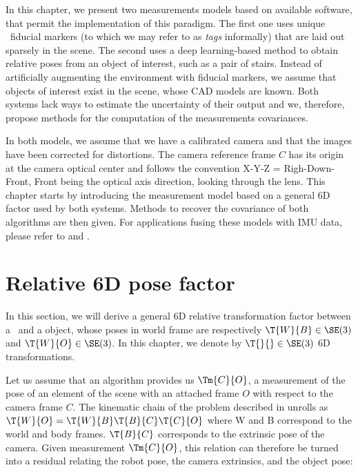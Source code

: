 In this chapter, we present two measurements models based on available software, that permit the implementation of this paradigm. The first one 
uses unique \apriltag\ fiducial markers \cite{wang2016iros} (to which we may refer to as \textit{tags} informally) that are laid out sparsely in the scene. 
The second uses a deep learning-based method \cite{labbe2020cosypose}
to obtain relative poses from an object of interest, such as a pair of stairs. Instead of artificially augmenting the environment with fiducial markers, we assume 
that objects of interest exist in the scene, whose CAD models are known. 
Both systems lack ways to estimate the uncertainty of their output and we, therefore, propose methods for the computation of the measurements covariances.

In both models, we assume that we have a calibrated camera and that the images have been corrected for distortions. The camera reference frame $C$ has its origin at 
the camera optical center and follows the convention X-Y-Z = Righ-Down-Front, Front being the optical axis direction, looking through the lens. This chapter starts by 
introducing the measurement model based on a general 6D factor used by both systems. Methods to recover the covariance of both algorithms are then given. 
For applications fusing these models with IMU data, please refer to  and .



\section{Relative 6D pose factor}
In this section, we will derive a general 6D relative transformation factor between a \keyframe\ and a object, whose poses in world frame are respectively $\T{W}{B} \in \SE(3)$ and $\T{W}{O} \in \SE(3)$. In this chapter, we denote by $\T{}{} \in \SE(3)$ 6D transformations.

Let us assume that an algorithm provides us $\Tm{C}{O}$, a measurement of the pose of an element 
of the scene with an attached frame $O$ with respect to the camera frame $C$.
The kinematic chain of the problem described in  unrolls as 
$\T{W}{O} = \T{W}{B}\T{B}{C}\T{C}{O}$ where W and B correspond to the world and body frames. $\T{B}{C}$ corresponds to the extrinsic pose 
of the camera.
Given measurement $\Tm{C}{O}$, this relation can therefore be turned into a residual relating 
the robot pose, the camera extrinsics, and the object pose:

